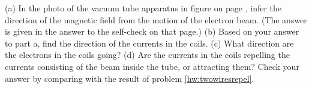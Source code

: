         (a) In the photo of the vacuum tube apparatus in figure 
        on page \pageref{fig:circular-orbit},
        infer the direction of the magnetic field from
        the motion of the electron beam. (The answer is given in the answer to the self-check
        on that page.)\hwendpart
        (b) Based on your answer to part
        a, find the direction of the currents in the coils.\hwendpart
        (c) What
        direction are the electrons in the coils going? \hwendpart
        (d) Are the
        currents in the coils repelling the currents
        consisting of the beam inside the tube, or attracting them? Check your answer by comparing with
        the result of problem \ref{hw:twowiresrepel}.
